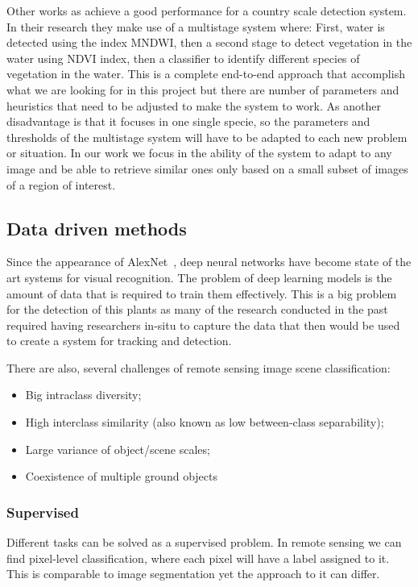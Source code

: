 \documentclass[conference]{IEEEtran}
\begin{document}
    Other works as \citet{rs12244021} achieve a good performance for a country scale detection system.
    In their research they make use of a multistage system where: First, water is detected using the index MNDWI, then a second stage to detect vegetation in the water using NDVI index, then a classifier to
    identify different species of vegetation in the water.
    This is a complete end-to-end approach that accomplish what we are looking for in this project but there are number of parameters and heuristics that need to be adjusted to make the system to work.
    As another disadvantage is that it focuses in one single specie, so the parameters and thresholds of the multistage system will have to be adapted to each new problem or situation.
    In our work we focus in the ability of the system to adapt to any image and be able to retrieve similar ones only based on a small subset of images of a region of interest.


    \subsection*{Data driven methods}
    Since the appearance of AlexNet~\cite{NIPS2012_c399862d}, deep neural networks have become state of the art systems for visual recognition.
    The problem of deep learning models is the amount of data that is required to train them effectively.
    This is a big problem for the detection of this plants as many of the research conducted in the past required having researchers in-situ to capture the data that then
    would be used to create a system for tracking and detection.

    There are also, several challenges of remote sensing image scene classification\cite{9127795}:
    \begin{itemize}
        \item Big intraclass diversity;
        \item High interclass similarity (also known as low between-class separability);
        \item Large variance of object/scene scales;
        \item Coexistence of multiple ground objects
    \end{itemize}

    \subsubsection{Supervised}

    Different tasks can be solved as a supervised problem.
    In remote sensing we can find pixel-level classification, where each pixel will have a label assigned to it.
    This is comparable to image segmentation yet the approach to it can differ.
\end{document}
